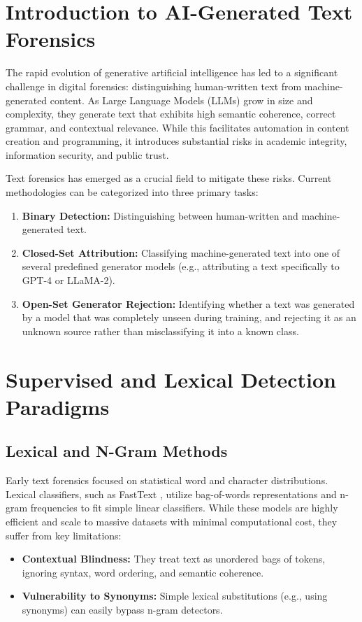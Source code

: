 \section{Introduction to AI-Generated Text Forensics}
\noindent The rapid evolution of generative artificial intelligence has led to a significant challenge in digital forensics: distinguishing human-written text from machine-generated content. As Large Language Models (LLMs) grow in size and complexity, they generate text that exhibits high semantic coherence, correct grammar, and contextual relevance. While this facilitates automation in content creation and programming, it introduces substantial risks in academic integrity, information security, and public trust. 

Text forensics has emerged as a crucial field to mitigate these risks. Current methodologies can be categorized into three primary tasks:
\begin{enumerate}
    \item \textbf{Binary Detection:} Distinguishing between human-written and machine-generated text.
    \item \textbf{Closed-Set Attribution:} Classifying machine-generated text into one of several predefined generator models (e.g., attributing a text specifically to GPT-4 or LLaMA-2).
    \item \textbf{Open-Set Generator Rejection:} Identifying whether a text was generated by a model that was completely unseen during training, and rejecting it as an unknown source rather than misclassifying it into a known class.
\end{enumerate}

\section{Supervised and Lexical Detection Paradigms}
\subsection{Lexical and N-Gram Methods}
Early text forensics focused on statistical word and character distributions. Lexical classifiers, such as FastText \cite{joulin2016bag}, utilize bag-of-words representations and n-gram frequencies to fit simple linear classifiers. While these models are highly efficient and scale to massive datasets with minimal computational cost, they suffer from key limitations:
\begin{itemize}
    \item \textbf{Contextual Blindness:} They treat text as unordered bags of tokens, ignoring syntax, word ordering, and semantic coherence.
    \item \textbf{Vulnerability to Synonyms:} Simple lexical substitutions (e.g., using synonyms) can easily bypass n-gram detectors.
\end{itemize}

